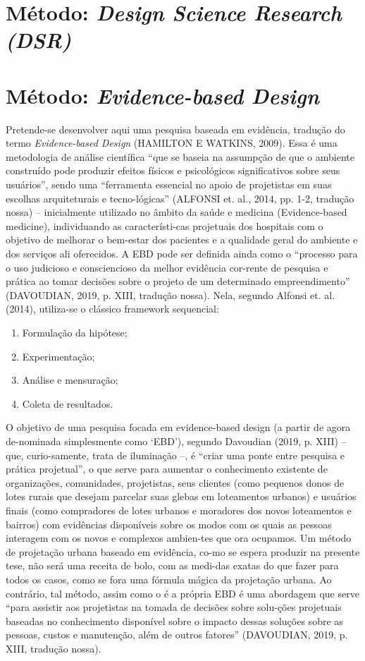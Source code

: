 \documentclass[twoside, 12pt, english,italian,latin,greek,french,spanish,brazil]{book}
\begin{document}
\section{Método: \textit{Design Science Research (DSR)}}


\section{Método: \textit{Evidence-based Design}}

        Pretende-se desenvolver aqui uma pesquisa baseada em evidência, tradução do termo \textit{Evidence-based Design} (HAMILTON E WATKINS, 2009).  Essa é uma metodologia de análise científica “que se baseia na assumpção de que o ambiente construído pode produzir efeitos físicos e psicológicos significativos sobre seus usuários”, sendo uma “ferramenta essencial no apoio de projetistas em suas escolhas arquiteturais e tecno-lógicas” (ALFONSI et. al., 2014, pp. 1-2, tradução nossa)  – inicialmente utilizado no âmbito da saúde e medicina (Evidence-based medicine), individuando as característi-cas projetuais dos hospitais com o objetivo de melhorar o bem-estar dos pacientes e a qualidade geral do ambiente e dos serviços ali oferecidos.  A EBD pode ser definida ainda como o “processo para o uso judicioso e consciencioso da melhor evidência cor-rente de pesquisa e prática ao tomar decisões sobre o projeto de um determinado empreendimento” (DAVOUDIAN, 2019, p. XIII, tradução nossa).  Nela, segundo Alfonsi et. al.  (2014), utiliza-se o clássico framework sequencial:
        \begin{enumerate}[label=\alph*)]
            \item  Formulação da hipótese;
            \item  Experimentação;
            \item  Análise e mensuração;
            \item  Coleta de resultados.
        \end{enumerate}

        O objetivo de uma pesquisa focada em evidence-based design (a partir de agora de-nominada simplesmente como ‘EBD’), segundo Davoudian (2019, p. XIII) – que, curio-samente, trata de iluminação –, é “criar uma ponte entre pesquisa e prática projetual”, o que serve para aumentar o conhecimento existente de organizações, comunidades, projetistas, seus clientes (como pequenos donos de lotes rurais que desejam parcelar suas glebas em loteamentos urbanos) e usuários finais (como compradores de lotes urbanos e moradores dos novos loteamentos e bairros) com evidências disponíveis sobre os modos com os quais as pessoas interagem com os novos e complexos ambien-tes que ora ocupamos. Um método de projetação urbana baseado em evidência,  co-mo se espera produzir na presente tese, não será uma receita de bolo, com as medi-das exatas do que fazer para todos os casos, como se fora uma fórmula mágica da projetação urbana. Ao contrário, tal método, assim como o é a própria EBD é uma abordagem que serve “para assistir aos projetistas na tomada de decisões sobre solu-ções projetuais baseadas no conhecimento disponível sobre o impacto dessas soluções sobre as pessoas, custos e manutenção, além de outros fatores” (DAVOUDIAN, 2019, p. XIII, tradução nossa). 
\end{document}
